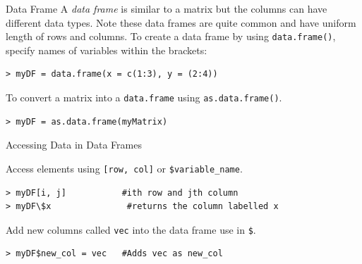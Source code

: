 \documentclass[xcolor=svgnames, 10pt, handout]{beamer}
\begin{document}
\begin{frame}[fragile]{Data Frame}
\vfill
A \emph{data frame} is similar to a matrix but the columns can have different data types.  Note these data frames are quite common and have uniform length of rows and columns.
\vfill
To create a data frame by using \texttt{data.frame()}, specify names of variables within the brackets:
\begin{Verbatim}[commandchars=\\\{\}, xleftmargin=2em]
> myDF = data.frame(x = c(1:3), y = (2:4))
\end{Verbatim}
\vfill
To convert a matrix into a \texttt{data.frame} using \texttt{as.data.frame()}.
\begin{Verbatim}[commandchars=\\\{\}, xleftmargin=2em]
> myDF = as.data.frame(myMatrix)
\end{Verbatim}
\vfill
\end{frame}


\begin{frame}[fragile]{Accessing Data in Data Frames}

Access elements using \texttt{[row, col]} or \verb|$variable_name|.
\begin{Verbatim}[commandchars=\\\{\}, xleftmargin=2em]
> myDF[i, j]           #ith row and jth column
> myDF\$x               #returns the column labelled x
\end{Verbatim}

Add new columns called \texttt{vec} into the data frame use in \verb|$|.
\begin{Verbatim}[commandchars=\\\{\}, xleftmargin=2em]
> myDF$new_col = vec   #Adds vec as new_col
\end{Verbatim}

\end{frame}
\end{document}
